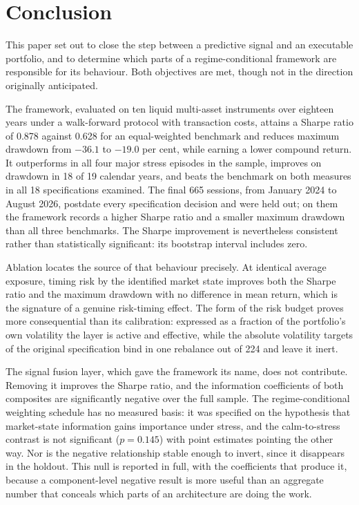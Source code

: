 \documentclass{singlecol-new}
\theoremstyle{TH}{
\newtheorem{lemma}{Lemma}
\newtheorem{theorem}[lemma]{Theorem}
\newtheorem{corrolary}[lemma]{Corrolary}
\newtheorem{conjecture}[lemma]{Conjecture}
\newtheorem{proposition}[lemma]{Proposition}
\newtheorem{claim}[lemma]{Claim}
\newtheorem{stheorem}[lemma]{Wrong Theorem}
\newtheorem{algorithm}{Algorithm}
}
\theoremstyle{THrm}{
\newtheorem{definition}{Definition}[section]
\newtheorem{question}{Question}[section]
\newtheorem{remark}{Remark}
\newtheorem{scheme}{Scheme}
}
\theoremstyle{THhit}{
\newtheorem{case}{Case}[section]
}
\begin{document}
\section{Conclusion}
\label{sec:conclusion}

This paper set out to close the step between a predictive signal and an executable
portfolio, and to determine which parts of a regime-conditional framework are
responsible for its behaviour. Both objectives are met, though not in the direction
originally anticipated.

The framework, evaluated on ten liquid multi-asset instruments over eighteen years under
a walk-forward protocol with transaction costs, attains a Sharpe ratio of 0.878 against
0.628 for an equal-weighted benchmark and reduces maximum drawdown from $-36.1$ to
$-19.0$ per cent, while earning a lower compound return. It outperforms in all four
major stress episodes in the sample, improves on drawdown in 18 of 19 calendar years,
and beats the benchmark on both measures in all 18 specifications examined. The final
665 sessions, from January 2024 to August 2026, postdate every specification decision
and were held out; on them the framework records a higher Sharpe ratio and a smaller
maximum drawdown than all three benchmarks. The Sharpe improvement is nevertheless
consistent rather than statistically significant: its bootstrap interval includes
zero.

Ablation locates the source of that behaviour precisely. At identical average exposure,
timing risk by the identified market state improves both the Sharpe ratio and the
maximum drawdown with no difference in mean return, which is the signature of a genuine
risk-timing effect. The form of the risk budget proves more consequential than its
calibration: expressed as a fraction of the portfolio's own volatility the layer is
active and effective, while the absolute volatility targets of the original
specification bind in one rebalance out of 224 and leave it inert.

The signal fusion layer, which gave the framework its name, does not contribute.
Removing it improves the Sharpe ratio, and the information coefficients of both
composites are significantly negative over the full sample. The regime-conditional
weighting schedule has no measured basis: it was specified on the hypothesis that
market-state information gains importance under stress, and the calm-to-stress contrast
is not significant ($p = 0.145$) with point estimates pointing the other way. Nor is the
negative relationship stable enough to invert, since it disappears in the holdout. This
null is reported in full,
with the coefficients that produce it, because a component-level negative result is more
useful than an aggregate number that conceals which parts of an architecture are doing
the work.
\end{document}

